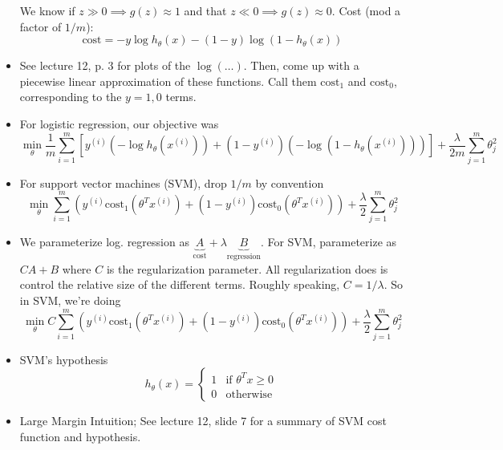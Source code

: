 \documentclass[10pt]{article}
\begin{document}
\begin{itemize}
    We know if $z \gg 0 \implies g(z) \approx 1$ and that $z \ll 0 \implies g(z) \approx 0$. Cost (mod a factor of $1/m$):
    \begin{equation*}
      \text{cost} = -y \log h_{\theta}(x) - (1-y) \log( 1 - h_{\theta}(x))
    \end{equation*}
  \item See lecture 12, p. 3 for plots of the $\log(\dots)$. Then,
    come up with a piecewise linear approximation of these
    functions. Call them $\text{cost}_1$ and $\text{cost}_0$,
    corresponding to the $y=1,0$ terms.
  \item For logistic regression, our objective was
    \begin{equation*}
      \min_{\theta} \frac{1}{m} \sum_{i=1}^m \left[ y^{(i)} \left( -\log h_{\theta}(x^{(i)}) \right) + (1 - y^{(i)}) \left( -\log \left(1 - h_{\theta}(x^{(i)})\right)\right)\right] + \frac{\lambda}{2m} \sum_{j=1}^m \theta_j^2
    \end{equation*}
  \item For support vector machines (SVM), drop $1/m$ by convention
    \begin{equation*}
      \min_{\theta}  \sum_{i=1}^m \left( y^{(i)} \text{cost}_1(\theta^Tx^{(i)}) + (1 - y^{(i)}) \text{cost}_0(\theta^Tx^{(i)}) \right) + \frac{\lambda}{2} \sum_{j=1}^m \theta_j^2
    \end{equation*}
  \item We parameterize log. regression as
    $\underbrace{A}_{\text{cost}} + \lambda
    \underbrace{B}_{\text{regression}}$. For SVM, parameterize as $CA
    + B$ where $C$ is the regularization parameter. All regularization
    does is control the relative size of the different terms. Roughly
    speaking, $C=1/\lambda$. So in SVM, we're doing
    \begin{equation*}
      \min_{\theta}  C\sum_{i=1}^m \left( y^{(i)} \text{cost}_1(\theta^Tx^{(i)}) + (1 - y^{(i)}) \text{cost}_0(\theta^Tx^{(i)}) \right) + \frac{\lambda}{2} \sum_{j=1}^m \theta_j^2
    \end{equation*}
  \item SVM's hypothesis
    \begin{equation*}
      h_{\theta}(x) = \begin{cases} 1 & \mbox{if } \theta^Tx \geq 0  \\ 0 & \mbox{otherwise }\end{cases}
    \end{equation*}
  \item Large Margin Intuition; See lecture 12, slide 7 for a summary of SVM cost function and hypothesis.

\end{itemize}
\end{document}
